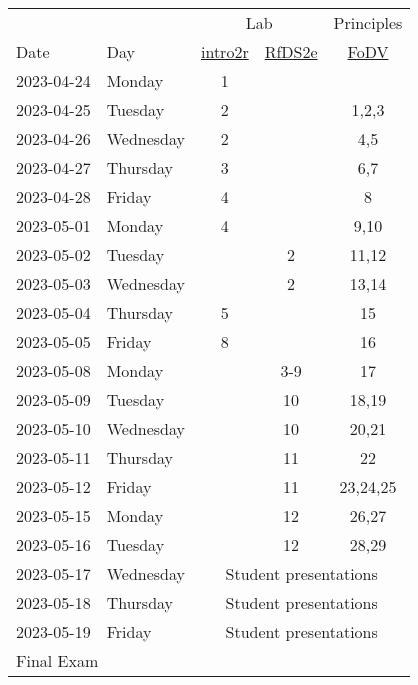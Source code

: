\documentclass[12pt]{article}
\begin{document}
\begin{description}
\begin{tabular}{llccc}
&&\multicolumn{2}{c}{\hrulefill Lab\hrulefill} & Principles \\
Date & Day & \href{https://intro2r.com/}{intro2r}
      & \href{https://r4ds.hadley.nz/}{RfDS2e}
       & \href{https://clauswilke.com/dataviz/index.html}{FoDV} \\\hline
2023-04-24     &     Monday     & 1 &  &    \\
 2023-04-25     &        Tuesday  & 2 & & 1,2,3      \\
 2023-04-26    &       Wednesday  & 2 & & 4,5      \\
 2023-04-27    &        Thursday     & 3 & & 6,7    \\
 2023-04-28    &          Friday      & 4 & &  8    \\\hline
 2023-05-01    &          Monday   & 4&   & 9,10   \\
 2023-05-02    &         Tuesday    &  & 2& 11,12    \\
 2023-05-03    &       Wednesday &  & 2 &  13,14    \\
 2023-05-04    &        Thursday   & 5 &   &  15   \\
 2023-05-05    &          Friday      &  8&  & 16    \\\hline
 2023-05-08    &          Monday   &  & 3-9 & 17   \\
 2023-05-09    &         Tuesday    &  & 10 & 18,19    \\
 2023-05-10    &       Wednesday &   &  10  & 20,21    \\
 2023-05-11   &         Thursday&  &  11&  22    \\
 2023-05-12   &           Friday   &   & 11  &  23,24,25  \\\hline
 2023-05-15   &           Monday&   & 12   &   26,27    \\
 2023-05-16   &          Tuesday&   &   12  &   28,29   \\
 2023-05-17   &        Wednesday&   \multicolumn{3}{c}{Student presentations}       \\
 2023-05-18   &         Thursday & \multicolumn{3}{c}{Student presentations}       \\
 2023-05-19   &           Friday   &  \multicolumn{3}{c}{Student presentations}     \\\hline
 \multicolumn{4}{l}{Final Exam}
\end{tabular}

\end{description}
\end{document}
